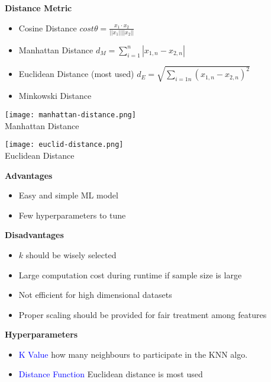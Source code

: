 \textbf{Distance Metric}
\begin{itemize}
    \item Cosine Distance $cost \theta = \frac{x_1 \cdot x_2}{||x_1|| ||x_2||}$
    \item Manhattan Distance $d_M = \sum_{i=1}^{n}| x_{1,n} - x_{2,n} |$
    \item Euclidean Distance (most used) $d_E = \sqrt{\sum_{i=1n}^{}(x_{1,n} - x_{2,n})^2}$
    \item Minkowski Distance
\end{itemize}

\begin{minipage}[t]{0.5\linewidth}
    \texttt{[image: manhattan-distance.png]} \\
    Manhattan Distance
\end{minipage}
\begin{minipage}[t]{0.5\linewidth}
    \texttt{[image: euclid-distance.png]} \\
    Euclidean Distance
\end{minipage}

\textbf{Advantages}
\begin{itemize}
    \item Easy and simple ML model
    \item Few hyperparameters to tune
\end{itemize}

\textbf{Disadvantages}
\begin{itemize}
    \item $k$ should be wisely selected
    \item Large computation cost during runtime if sample size is large
    \item Not efficient for high dimensional datasets
    \item Proper scaling should be provided for fair treatment among features
\end{itemize}

\textbf{Hyperparameters}
\begin{itemize}
    \item \textcolor{blue}{K Value} how many neighbours to participate in the KNN algo.
    \item \textcolor{blue}{Distance Function} Euclidean distance is most used
\end{itemize}
